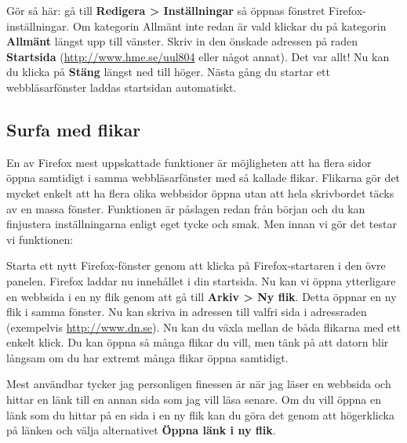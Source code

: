 \documentclass[a4paper,final]{memoir} %
\newcommand\xshortname{uul804}
\newcommand\xurl{http://www.hme.se/}
\begin{document}
Gör så här: gå till \textbf{Redigera \textgreater{} Inställningar} så öppnas fönstret Firefox-inställningar. Om kategorin Allmänt inte redan är vald klickar du på kategorin \textbf{Allmänt} längst upp till vänster. Skriv in den önskade adressen på raden \textbf{Startsida} (\url{\xurl\xshortname} eller något annat). Det var allt!  Nu kan du klicka på \textbf{Stäng} längst ned till höger. Nästa gång du startar ett webbläsarfönster laddas startsidan automatiskt.



\subsection{Surfa med flikar}


En av Firefox mest uppskattade funktioner är möjligheten att ha flera sidor öppna samtidigt i samma webbläsarfönster med så kallade flikar. Flikarna gör det mycket enkelt att ha flera olika webbsidor öppna utan att hela skrivbordet täcks av en massa fönster. Funktionen är påslagen redan från början och du kan finjustera inställningarna enligt eget tycke och smak. Men innan vi gör det testar vi funktionen:

Starta ett nytt Firefox-fönster genom att klicka på Firefox-startaren i den övre panelen. Firefox laddar nu innehållet i din startsida. Nu kan vi öppna ytterligare en webbsida i en ny flik genom att gå till \textbf{Arkiv \textgreater{} Ny flik}. Detta öppnar en ny flik i samma fönster. Nu kan skriva in adressen till valfri sida i adressraden (exempelvis \url{http://www.dn.se}). Nu kan du växla mellan de båda flikarna med ett enkelt klick. Du kan öppna så många flikar du vill, men tänk på att datorn blir långsam om du har extremt många flikar öppna samtidigt. 

Mest användbar tycker jag personligen finessen är när jag läser en webbsida och hittar en länk till en annan sida som jag vill läsa senare. Om du vill öppna en länk som du hittar på en sida i en ny flik kan du göra det genom att högerklicka på länken och välja alternativet \textbf{Öppna länk i ny flik}.
\end{document}
